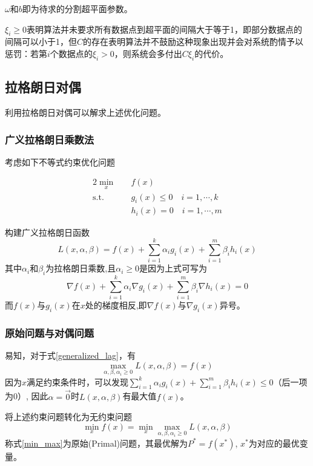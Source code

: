 \documentclass[supercite]{upcthesis}
\begin{document}
$\omega$和$b$即为待求的分割超平面参数。

$\xi_i \geq 0 $表明算法并未要求所有数据点到超平面的间隔大于等于1，即部分数据点的间隔可以小于1，但$C$的存在表明算法并不鼓励这种现象出现并会对系统酌情予以惩罚：若第$i$个数据点的$\xi_i > 0$，则系统会多付出$C\xi_i$的代价。
\subsection{拉格朗日对偶}
利用拉格朗日对偶可以解求上述优化问题。
\subsubsection{广义拉格朗日乘数法}
考虑如下不等式约束优化问题

\begin{alignat}{2}
\min\limits_x \quad & f(x) \\
\text{s.t.} \quad & g_i(x) \leq 0 \quad i=1,\cdots,k\nonumber\\
& h_i(x)=0 \quad i=1,\cdots,m\nonumber
\end{alignat}


构建广义拉格朗日函数
\begin{equation}
L(x,\alpha,\beta)=f(x)+\sum_{i=1}^{k}\alpha_{i}g_{i}(x)+\sum_{i=1}^{m}\beta_{i}h_{i}(x)
\label{generalized_lag}
\end{equation}
其中$\alpha_{i}$和$\beta_{i}$为拉格朗日乘数,且$\alpha_{i}\geq 0$是因为上式可写为
\begin{equation}
\nabla f(x)+\sum_{i=1}^{k}\alpha_{i}\nabla g_{i}(x)+\sum_{i=1}^{m}\beta_{i}\nabla h_{i}(x)=0
\end{equation}
而$f(x)$与$g_{i}(x)$在$x$处的梯度相反,即$\nabla f(x)$与$\nabla g_{i}(x)$异号。
\subsubsection{原始问题与对偶问题}
易知，对于式\ref{generalized_lag}，有
\begin{equation}
\max\limits_{\alpha,\beta,\alpha_i\geq0} L(x,\alpha,\beta)=f(x)
\end{equation}
因为$x$满足约束条件时，可以发现$\sum_{i=1}^{k}\alpha_{i}g_{i}(x)+\sum_{i=1}^{m}\beta_{i}h_{i}(x) \leq 0$（后一项为0）,  因此$\alpha=\vec{0}$时$L(x,\alpha,\beta)$有最大值$f(x)$。

将上述约束问题转化为无约束问题
\begin{equation}
\min\limits_{x}f(x)=\min\limits_{x}\max\limits_{\alpha,\beta,\alpha_i\geq0}L(x,\alpha,\beta)
\label{min_max}
\end{equation}
称式\ref{min_max}为原始(Primal)问题，其最优解为$P^{*}=f(x^{*})$, $x^{*}$为对应的最优变量。
\end{document}

